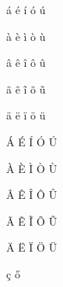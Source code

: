 \documentclass[12pt,a4paper]{article}
\begin{document}
á
é
í
ó
ú
 
à
è
ì
ò
ù
 
â
ê
î
ô
û
 
ã
ẽ
ĩ
õ
ũ
 
ä
ë
ï
ö
ü
 
Á
É
Í
Ó
Ú
 
À
È
Ì
Ò
Ù
 
Â
Ê
Î
Ô
Û
 
Ã
Ẽ
Ĩ
Õ
Ũ
 
Ä
Ë
Ï
Ö
Ü
 
ç
ő
\end{document}
